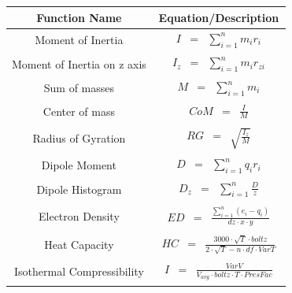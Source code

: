 \documentclass[11pt,a4paper]{report}
\begin{document}
\begin{table}[h]
\centering
\resizebox{\columnwidth}{!}
{
\begin{minipage}{\columnwidth}
\centering
\renewcommand*{\arraystretch}{1.5}
\tabcolsep=0.12cm
\begin{tabular}{|c| c|}
\hline %
Function Name & Equation/Description \\[0.5ex] 
\hline
Moment of Inertia & $\begin{array} {lcl} I & = & \sum\limits_{i=1}^n m_ir_i \end{array}$ \\[0.5ex]
\hline
Moment of Inertia on z axis & $\begin{array} {lcl} I_z & = & \sum\limits_{i=1}^n m_ir_{zi} \end{array}$ \\[0.5ex]
\hline
Sum of masses & $\begin{array} {lcl} M & = & \sum\limits_{i=1}^n m_i \end{array}$ \\[0.5ex]
\hline
Center of mass & $\begin{array} {lcl} CoM & = & \frac{I}{M} \end{array}$ \\[0.5ex]
\hline
Radius of Gyration & $\begin{array} {lcl} RG & = & \sqrt{\frac{I_z}{M}} \end{array}$ \\[0.5ex]
\hline
Dipole Moment& $\begin{array} {lcl} D & = & \sum\limits_{i=1}^n q_ir_i \end{array}$ \\[0.5ex]
\hline
Dipole Histogram & $\begin{array} {lcl} D_z & = & \sum\limits_{i=1}^n \frac{D}{z} \end{array}$ \\[0.5ex]
\hline
Electron Density & $\begin{array} {lcl} ED & = & \frac{\sum\limits_{i=1}^n (e_i-q_i)}{dz \cdot x \cdot y} \end{array}$ \\[0.5ex]
\hline
Heat Capacity & $\begin{array} {lcl} HC & = & \frac{3000 \cdot \sqrt{T} \cdot boltz}{2 \cdot \sqrt{T}-n \cdot df \cdot VarT} \end{array}$ \\[0.5ex]
\hline
Isothermal Compressibility & $\begin{array} {lcl} I & = & \frac{VarV}{V_{avg} \cdot boltz \cdot T \cdot PresFac} \end{array}$ \\[0.5ex]

\end{tabular}
\end{minipage}}
\end{table}
\end{document}
